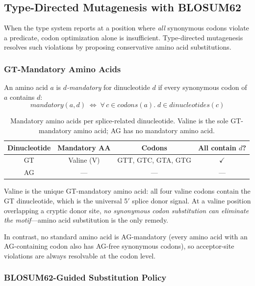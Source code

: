 \subsection{Type-Directed Mutagenesis with BLOSUM62}\label{sec:mut}

When the type system reports \FAIL{} at a position where \emph{all}
synonymous codons violate a predicate, codon optimization alone is
insufficient.
Type-directed mutagenesis resolves such violations by proposing
conservative amino acid substitutions.

\subsubsection{GT-Mandatory Amino Acids}

\begin{definition}
An amino acid $a$ is \emph{$d$-mandatory} for dinucleotide $d$ if
every synonymous codon of $a$ contains $d$:
\[
  \mathit{mandatory}(a, d) \;\iff\;
  \forall\, c \in \mathit{codons}(a).\; d \in \mathit{dinucleotides}(c)
\]
\end{definition}

\begin{table}[t]
\centering
\caption{Mandatory amino acids per splice-related dinucleotide.
         Valine is the sole GT-mandatory amino acid;
         AG has no mandatory amino acid.}
\label{tab:mandatory}
\begin{tabular}{cccc}
\toprule
\textbf{Dinucleotide} & \textbf{Mandatory AA} & \textbf{Codons} &
  \textbf{All contain $d$?} \\
\midrule
GT & Valine (V) & GTT, GTC, GTA, GTG & $\checkmark$ \\
AG & --- & --- & --- \\
\bottomrule
\end{tabular}
\end{table}

Valine is the unique GT-mandatory amino acid: all four valine codons
contain the GT dinucleotide, which is the universal 5$'$ splice donor
signal.
At a valine position overlapping a cryptic donor site, \emph{no
synonymous codon substitution can eliminate the motif}---amino acid
substitution is the only remedy.

In contrast, no standard amino acid is AG-mandatory (every amino acid
with an AG-containing codon also has AG-free synonymous codons), so
acceptor-site violations are always resolvable at the codon level.

\subsubsection{BLOSUM62-Guided Substitution Policy}

